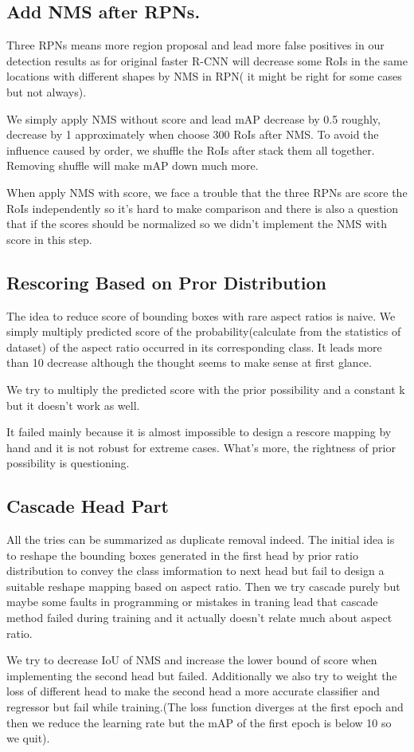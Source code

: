 \documentclass[10pt,twocolumn,letterpaper]{article}
\begin{document}
\subsection{Add NMS after RPNs.}
\par
Three RPNs means more region proposal and lead more false positives in our detection results as for original faster R-CNN will decrease some RoIs in the same locations with different shapes by NMS in RPN( it might be right for some cases but not always).

\par
We simply apply NMS without score and lead mAP decrease by 0.5 roughly, decrease by 1 approximately when choose 300 RoIs after NMS. To avoid the influence caused by order, we shuffle the RoIs after stack them all together. Removing shuffle will make mAP down much more.

\par
When apply NMS with score, we face a trouble that the three RPNs are score the RoIs independently so it’s hard to make comparison and there is also a question that if the scores should be normalized so we didn’t implement the NMS with score in this step.

\subsection{Rescoring Based on Pror Distribution}
The idea to reduce score of bounding boxes with rare aspect ratios is naive. We simply multiply predicted score of the probability(calculate from the statistics of dataset) of the aspect ratio occurred in its corresponding class. It leads more than 10 decrease although the thought seems to make sense at first glance.
\par
We try to multiply the predicted score with the prior possibility and a constant k but it doesn't work as well.
\par
It failed mainly because it is almost impossible to design a rescore mapping by hand and it is not robust for extreme cases. What's more, the rightness of prior possibility is questioning.

\subsection{Cascade Head Part}
\par
All the tries can be summarized as duplicate removal indeed. The initial idea is to reshape the bounding boxes generated in the first head by prior ratio distribution to convey the class imformation to next head but fail to design a suitable reshape mapping based on aspect ratio. Then we try cascade purely but maybe some faults in programming or mistakes in traning lead that cascade method failed during training and it actually doesn't relate much about aspect ratio.
\par
We try to decrease IoU of NMS and increase the lower bound of score when implementing the second head but failed. Additionally we also try to weight the loss of different head to make the second head a more accurate classifier and regressor but fail while training.(The loss function diverges at the first epoch and then we reduce the learning rate but the mAP of the first epoch is below 10 so we quit).
\end{document}
